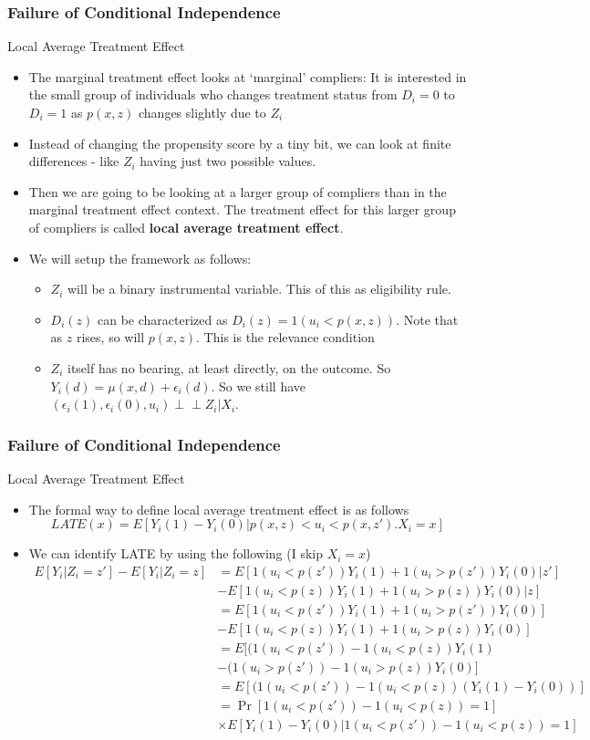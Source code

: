 \documentclass{beamer}
\begin{document}
\begin{frame}
\frametitle{Failure of Conditional Independence}
Local Average Treatment Effect
\begin{itemize}
\item The marginal treatment effect looks at `marginal' compliers: It is interested in the small group of individuals who changes treatment status from $D_i=0$  to $D_i=1$ as $p(x,z)$ changes slightly due to $Z_i$
\item Instead of changing the propensity score by a tiny bit, we can look at finite differences - like $Z_i$ having just two possible values. 
\item Then we are going to be looking at a larger group of compliers than in the marginal treatment effect context. The treatment effect for this larger group of compliers is called \textbf{local average treatment effect}.
\item We will setup the framework as follows:
\begin{itemize}
\item $Z_i$ will be a binary instrumental variable. This of this as eligibility rule. 
\item $D_i(z)$ can be characterized as $D_i(z)=1(u_i<p(x,z))$. Note that as $z$ rises, so will $p(x,z)$. This is the relevance condition
\item $Z_i$ itself has no bearing, at least directly, on the outcome. So $Y_i(d)=\mu(x,d)+\epsilon_i(d)$. So we still have $(\epsilon_i(1), \epsilon_i(0), u_i)\perp\!\!\!\perp Z_i|X_i$. 
\end{itemize}
\end{itemize}
\end{frame}

\begin{frame}
\frametitle{Failure of Conditional Independence}
Local Average Treatment Effect
\begin{itemize}
\item The formal way to define local average treatment effect is as follows
\[
LATE(x)=E[Y_i(1)-Y_i(0)|p(x,z)<u_i<p(x,z'). X_i=x]
\]
\item We can identify LATE by using the following (I skip $X_i=x$)
\footnotesize{\begin{align*}
E[Y_i|Z_i=z']-E[Y_i|Z_i=z]&=E[1(u_i<p(z'))Y_i(1)+1(u_i>p(z'))Y_i(0)|z']\\
&-E[1(u_i<p(z))Y_i(1)+1(u_i>p(z))Y_i(0)|z]\\
&=E[1(u_i<p(z'))Y_i(1)+1(u_i>p(z'))Y_i(0)]\\
&-E[1(u_i<p(z))Y_i(1)+1(u_i>p(z))Y_i(0)]\\
&=E[(1(u_i<p(z'))-1(u_i<p(z))Y_i(1)\\
&-(1(u_i>p(z'))-1(u_i>p(z))Y_i(0)]\\
&=E[(1(u_i<p(z'))-1(u_i<p(z))(Y_i(1)-Y_i(0))]\\
&=\Pr[1(u_i<p(z'))-1(u_i<p(z))=1]\\
&\times E[Y_i(1)-Y_i(0)|1(u_i<p(z'))-1(u_i<p(z))=1]
\end{align*}}\normalsize
\end{itemize}
\end{frame}
\end{document}
